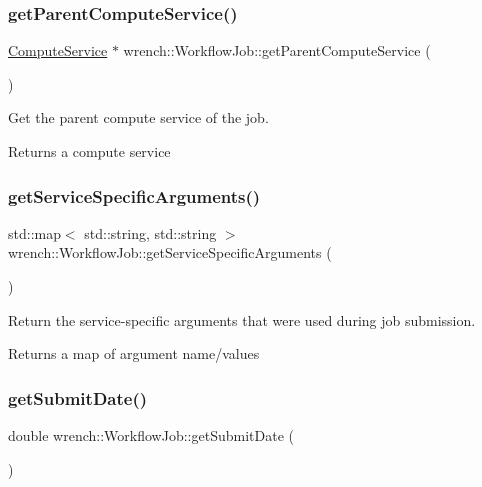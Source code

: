 \subsubsection{\texorpdfstring{get\+Parent\+Compute\+Service()}{getParentComputeService()}}
{\footnotesize\ttfamily \hyperlink{classwrench_1_1_compute_service}{Compute\+Service} $\ast$ wrench\+::\+Workflow\+Job\+::get\+Parent\+Compute\+Service (\begin{DoxyParamCaption}{ }\end{DoxyParamCaption})}



Get the parent compute service of the job. 

\begin{DoxyReturn}{Returns}
a compute service 
\end{DoxyReturn}
\mbox{\label{classwrench_1_1_workflow_job_a7e5ce22d0b057d90fc18dd0cbbfaa692}} 
\subsubsection{\texorpdfstring{get\+Service\+Specific\+Arguments()}{getServiceSpecificArguments()}}
{\footnotesize\ttfamily std\+::map$<$ std\+::string, std\+::string $>$ wrench\+::\+Workflow\+Job\+::get\+Service\+Specific\+Arguments (\begin{DoxyParamCaption}{ }\end{DoxyParamCaption})}



Return the service-\/specific arguments that were used during job submission. 

\begin{DoxyReturn}{Returns}
a map of argument name/values 
\end{DoxyReturn}
\mbox{\label{classwrench_1_1_workflow_job_a05f015d4d97263662bf2d6d617611a34}} 
\subsubsection{\texorpdfstring{get\+Submit\+Date()}{getSubmitDate()}}
{\footnotesize\ttfamily double wrench\+::\+Workflow\+Job\+::get\+Submit\+Date (\begin{DoxyParamCaption}{ }\end{DoxyParamCaption})}



